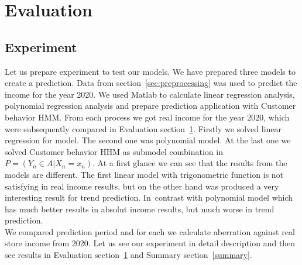 \chapter{Evaluation} \label{evaluation}
\section{Experiment} \label{experiment}
Let us prepare experiment to test our models.
We have prepared three models to create a prediction.
Data from section~\ref{sec:preprocessing} was used to predict the income for the year 2020.
We used Matlab to calculate linear regression analysis, polynomial regression analysis and prepare prediction application with Customer behavior HMM.
From each process we got real income for the year 2020, which were subsequently compared in Evaluation section~\ref{evaluation}.
Firstly we solved linear regression for model.
The second one was polynomial model.
At the last one we solved Customer behavior HHM as submodel combination in $P = (Y_n \in A|X_n = x_n)$.
At a first glance we can see that the results from the models are different.
The first linear model with trigonometric function is not satisfying in real income results, but on the other hand was produced a very interesting result for trend prediction.
In~contrast with polynomial model which has much better results in absolut income results, but much worse in trend prediction.\\
We compared prediction period and for each we calculate aberration against real store income from 2020.
Let us see our experiment in detail description and then see results in Evaluation section~\ref{evaluation} and Summary section~\ref{summary}.\\
